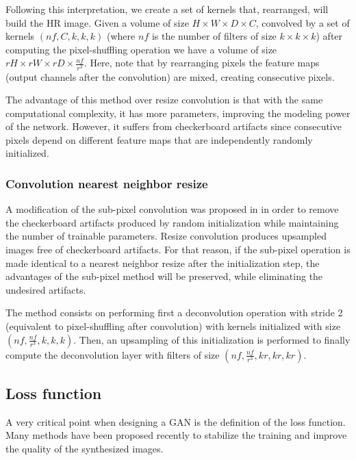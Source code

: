 \documentclass{article}
\begin{document}
Following this interpretation, we create a set of kernels that, rearranged, will build the HR image. Given a volume of size $ H \times W \times D \times C $, convolved by a set of kernels $(nf, C, k, k, k)$ (where $nf$ is the number of filters of size $k \times k \times k$) after computing the pixel-shuffling operation we have a volume of size $ rH \times rW \times rD \times \frac{nf}{r^{3}} $. Here, note that by rearranging pixels the feature maps (output channels after the convolution) are mixed, creating consecutive pixels. 

The advantage of this method over resize convolution is that with the same computational complexity, it has more parameters, improving the modeling power of the network. However, it suffers from checkerboard artifacts since consecutive pixels depend on different feature maps that are independently randomly initialized.  



\subsubsection{Convolution nearest neighbor resize}
\label{sssec:free_subpixel}
A modification of the sub-pixel convolution was proposed in \cite{aitken:checkboardfree} in order to remove the  checkerboard artifacts produced by random initialization while maintaining the number of trainable parameters. Resize convolution produces upsampled images free of checkerboard artifacts. For that reason, if the sub-pixel operation is made identical to a nearest neighbor resize after the initialization step, the advantages of the sub-pixel method will be preserved, while eliminating the undesired artifacts.

The method consists on performing first a deconvolution operation with stride 2 (equivalent to pixel-shuffling after convolution) with kernels initialized with size $(nf, \frac{nf}{r^{3}}, k, k, k)$. Then, an upsampling of this initialization is performed to finally compute the deconvolution layer with filters of size $(nf, \frac{nf}{r^{3}}, kr, kr, kr)$.

\subsection{Loss function}
\label{ssec:loss}
A very critical point when designing a GAN is the definition of the loss function.
Many methods have been proposed recently to stabilize the training and improve the quality of the synthesized images. 
\end{document}
